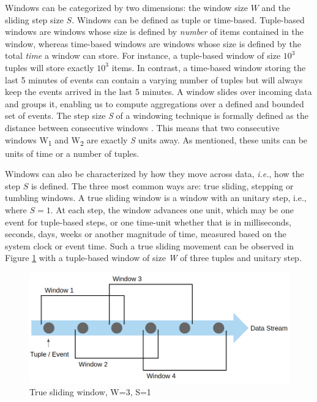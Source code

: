 Windows can be categorized by two dimensions: the window size $W$ and the sliding step size $S$. Windows can be defined as tuple or time-based. Tuple-based windows are windows whose size is defined by \emph{number} of items contained in the window, whereas time-based windows are windows whose size is defined by the total \emph{time} a window can store. For instance, a tuple-based window of size $10^3$ tuples will store exactly $10^3$ items. In contrast, a time-based window storing the last 5 minutes of events can contain a varying number of tuples but will always keep the events arrived in the last 5 minutes. A window slides over incoming data and groups it, enabling us to compute aggregations over a defined and bounded set of events. The step size \textit{S} of a windowing technique is formally defined as the distance between consecutive windows \cite{Botan-SECRET}. This means that two consecutive windows W\textsubscript{1} and W\textsubscript{2} are exactly \textit{S} units away. As mentioned, these units can be units of time or a number of tuples.

Windows can also be characterized by how they move across data, \textit{i.e.}, how the step $S$ is defined. The three most common ways are: true sliding, stepping or tumbling windows. A true sliding window is a window with an unitary step, i.e., where $S = 1$. At each step, the window advances one unit, which may be one event for tuple-based steps, or one time-unit whether that is in milliseconds, seconds, days, weeks or another magnitude of time, measured based on the system clock or event time. Such a true sliding movement can be observed in Figure \ref{fig:sliding-window} with a tuple-based window of size \textit{W} of three tuples and unitary step. 

\begin{figure}[!htb]
    \begin{center}
      \hspace*{0.6in}
      \includegraphics[scale=0.35]{figures/sliding.png}
      \caption[True sliding window]{True sliding window, W=3, S=1}
      \label{fig:sliding-window} 
    \end{center}
\end{figure} 


